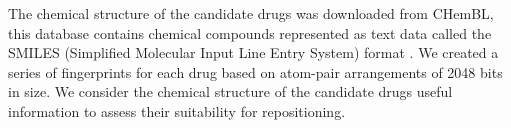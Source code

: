 \documentclass[preprint,11pt]{elsarticle}
\begin{document}

The chemical structure of the candidate drugs was downloaded from CHemBL, this database contains chemical compounds represented as text data called the SMILES (Simplified Molecular Input Line Entry System) format \cite{Weininger1988}. We created a series of fingerprints for each drug based on atom-pair arrangements of 2048 bits in size. We consider the chemical structure of the candidate drugs useful information to assess their suitability for repositioning.
\end{document}
